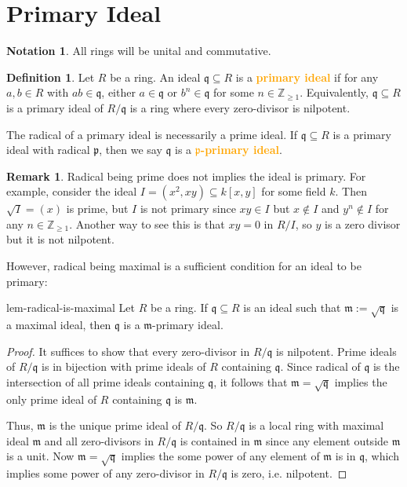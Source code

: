 \documentclass[a4paper,10pt]{article}
\makeatletter
\theoremstyle{definition}
\newtheorem{remark}[tcb@cnt@theorem]{Remark}
\newtheorem{notation}[tcb@cnt@theorem]{Notation}
\newtheorem{definition}[tcb@cnt@theorem]{Definition}
\newcommand\di[1]{\index{#1}\textbf{\textcolor{orange}{#1}}}
\newcommand\dni[1]{\textbf{\textcolor{orange}{#1}}}
\renewcommand\geq{\geqslant}
\makeatother
\begin{document}
\def\numberline#1{}
\hypertarget{toc}{}
\tableofcontents
\pagebreak

\section{Primary Ideal}
\begin{notation}
All rings will be unital and commutative.
\end{notation}

\begin{definition}
Let $R$ be a ring. 
An ideal $\mathfrak{q}\subseteq R$ is a \di{primary ideal} if 
for any $a,b\in R$ with $ab\in\mathfrak{q}$, either $a\in\mathfrak{q}$ 
or $b^n\in\mathfrak{q}$ for some $n\in\mathbb{Z}_{\geq1}$.
Equivalently, $\mathfrak{q}\subseteq R$ is a primary ideal of 
$R/\mathfrak{q}$ is a ring where every zero-divisor is nilpotent.

The radical of a primary ideal is necessarily a prime ideal.
If $\mathfrak{q}\subseteq R$ is a primary ideal with radical $\mathfrak{p}$, 
then we say $\mathfrak{q}$ is a \dni{$\mathfrak{p}$-primary ideal}.
\end{definition}

\begin{remark}
Radical being prime does not implies the ideal is primary.
For example, consider the ideal $I=(x^2,xy)\subseteq k[x,y]$ for some field $k$.
Then $\sqrt{I}=(x)$ is prime, but $I$ is not primary since 
$xy\in I$ but $x\not\in I$ and $y^n\not\in I$ for any $n\in\mathbb{Z}_{\geq1}$.
Another way to see this is that $xy=0$ in $R/I$,
so $y$ is a zero divisor but it is not nilpotent.

However, radical being maximal is a sufficient condition 
for an ideal to be primary:
\end{remark}

\begin{lemma}{}{lem-radical-is-maximal}
Let $R$ be a ring.
If $\mathfrak{q}\subseteq R$ is an ideal such that 
$\mathfrak{m}:=\sqrt{\mathfrak{q}}$ is a maximal ideal,
then $\mathfrak{q}$ is a $\mathfrak{m}$-primary ideal.
\end{lemma}
\begin{proof}
It suffices to show that every zero-divisor in $R/\mathfrak{q}$ is nilpotent.
Prime ideals of $R/\mathfrak{q}$ is in bijection with 
prime ideals of $R$ containing $\mathfrak{q}$.
Since radical of $\mathfrak{q}$ is the intersection of all prime ideals 
containing $\mathfrak{q}$, it follows that $\mathfrak{m}=\sqrt{\mathfrak{q}}$
implies the only prime ideal of $R$ containing $\mathfrak{q}$ is $\mathfrak{m}$.

Thus, $\mathfrak{m}$ is the unique prime ideal of $R/\mathfrak{q}$.
So $R/\mathfrak{q}$ is a local ring with maximal ideal $\mathfrak{m}$
and all zero-divisors in $R/\mathfrak{q}$ is contained in $\mathfrak{m}$
since any element outside $\mathfrak{m}$ is a unit.
Now $\mathfrak{m}=\sqrt{\mathfrak{q}}$ implies 
the some power of any element of $\mathfrak{m}$ is in $\mathfrak{q}$,
which implies some power of any zero-divisor in $R/\mathfrak{q}$ 
is zero, i.e. nilpotent.
\end{proof}
\end{document}
